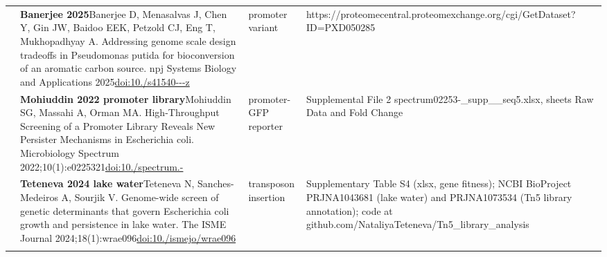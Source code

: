 \begin{landscape}
\begin{longtable}{@{}r@{\hspace{4pt}} L{86mm} L{74mm} L{78mm}@{}}
 & \textbf{Banerjee 2025}\newline Banerjee D, Menasalvas J, Chen Y, Gin JW, Baidoo EEK, Petzold CJ, Eng T, Mukhopadhyay A. Addressing genome scale design tradeoffs in Pseudomonas putida for bioconversion of an aromatic carbon source. npj Systems Biology and Applications 2025\newline \href{https://doi.org/10.1038/s41540-024-00480-z}{doi:10./\allowbreak s41540---\allowbreak z} & promoter variant & https:/\allowbreak /\allowbreak proteomecentral.\allowbreak proteomexchange.\allowbreak org/\allowbreak cgi/\allowbreak GetDataset?ID=PXD050285 \\
 & \textbf{Mohiuddin 2022 promoter library}\newline Mohiuddin SG, Massahi A, Orman MA. High-Throughput Screening of a Promoter Library Reveals New Persister Mechanisms in Escherichia coli. Microbiology Spectrum 2022;10(1):e0225321\newline \href{https://doi.org/10.1128/spectrum.02253-21}{doi:10./\allowbreak spectrum.-} & promoter-GFP reporter & Supplemental File 2 spectrum02253-\_\allowbreak supp\_\_\allowbreak seq5.\allowbreak xlsx, sheets Raw Data and Fold Change \\
 & \textbf{Teteneva 2024 lake water}\newline Teteneva N, Sanches-Medeiros A, Sourjik V. Genome-wide screen of genetic determinants that govern Escherichia coli growth and persistence in lake water. The ISME Journal 2024;18(1):wrae096\newline \href{https://doi.org/10.1093/ismejo/wrae096}{doi:10./\allowbreak ismejo/\allowbreak wrae096} & transposon insertion & Supplementary Table S4 (xlsx, gene fitness); NCBI BioProject PRJNA1043681 (lake water) and PRJNA1073534 (Tn5 library annotation); code at github.\allowbreak com/\allowbreak NataliyaTeteneva/\allowbreak Tn5\_\allowbreak library\_\allowbreak analysis \\
\addlinespace[5pt]

\end{longtable}
\end{landscape}
